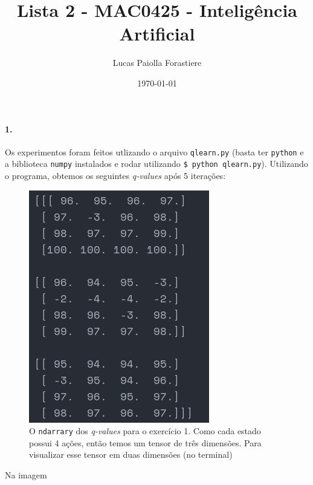 \documentclass[12pt, a4paper, oneside]{book}
\title{Lista 2 - MAC0425 - Inteligência Artificial}
\date{\today}
\author{Lucas Paiolla Forastiere}
\begin{document}
\maketitle

\paragraph{1.}%
\label{par:1_}

Os experimentos foram feitos utlizando o arquivo \texttt{qlearn.py} (basta ter
\texttt{python} e a biblioteca \texttt{numpy} instalados e rodar utilizando
\texttt{\$ python qlearn.py}). Utilizando o programa, obtemos os seguintes
\textit{q-values} após 5 iterações:

\begin{figure}[h]
\centering
\includegraphics[scale=0.8]{Res/q-values-ex1.png}
\caption{O \texttt{ndarrary} dos \textit{q-values} para o exercício 1. Como cada
estado possui 4 ações, então temos um tensor de três dimensões. Para visualizar
esse tensor em duas dimensões (no terminal) }
\label{q-values-ex1.png}
\end{figure}

Na imagem





\end{document}
